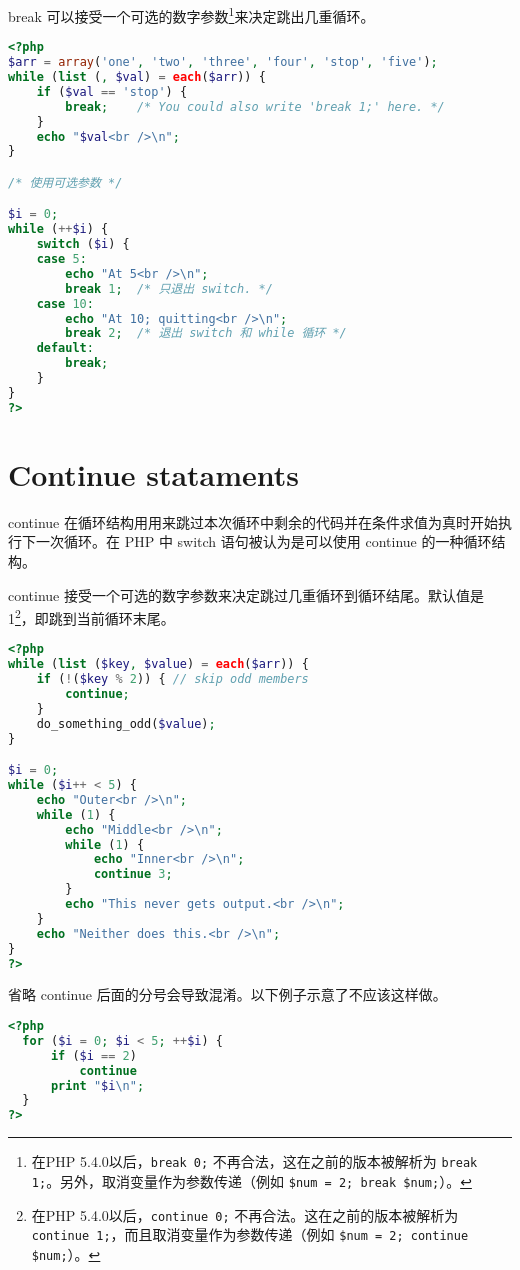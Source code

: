 break 可以接受一个可选的数字参数\footnote{在PHP 5.4.0以后，\texttt{break 0;} 不再合法，这在之前的版本被解析为 \texttt{break 1;}。另外，取消变量作为参数传递（例如 \texttt{\$num = 2; break \$num;}）。}来决定跳出几重循环。


\begin{lstlisting}[language=PHP]
<?php
$arr = array('one', 'two', 'three', 'four', 'stop', 'five');
while (list (, $val) = each($arr)) {
    if ($val == 'stop') {
        break;    /* You could also write 'break 1;' here. */
    }
    echo "$val<br />\n";
}

/* 使用可选参数 */

$i = 0;
while (++$i) {
    switch ($i) {
    case 5:
        echo "At 5<br />\n";
        break 1;  /* 只退出 switch. */
    case 10:
        echo "At 10; quitting<br />\n";
        break 2;  /* 退出 switch 和 while 循环 */
    default:
        break;
    }
}
?>
\end{lstlisting}




\section{Continue stataments}


continue 在循环结构用用来跳过本次循环中剩余的代码并在条件求值为真时开始执行下一次循环。在 PHP 中 switch 语句被认为是可以使用 continue 的一种循环结构。

continue 接受一个可选的数字参数来决定跳过几重循环到循环结尾。默认值是 1\footnote{在PHP 5.4.0以后，\texttt{continue 0;} 不再合法。这在之前的版本被解析为 \texttt{continue 1;}，而且取消变量作为参数传递（例如 \texttt{\$num = 2; continue \$num;}）。}，即跳到当前循环末尾。

\begin{lstlisting}[language=PHP]
<?php
while (list ($key, $value) = each($arr)) {
    if (!($key % 2)) { // skip odd members
        continue;
    }
    do_something_odd($value);
}

$i = 0;
while ($i++ < 5) {
    echo "Outer<br />\n";
    while (1) {
        echo "Middle<br />\n";
        while (1) {
            echo "Inner<br />\n";
            continue 3;
        }
        echo "This never gets output.<br />\n";
    }
    echo "Neither does this.<br />\n";
}
?>
\end{lstlisting}

省略 continue 后面的分号会导致混淆。以下例子示意了不应该这样做。

\begin{lstlisting}[language=PHP]
<?php
  for ($i = 0; $i < 5; ++$i) {
      if ($i == 2)
          continue
      print "$i\n";
  }
?>
\end{lstlisting}

